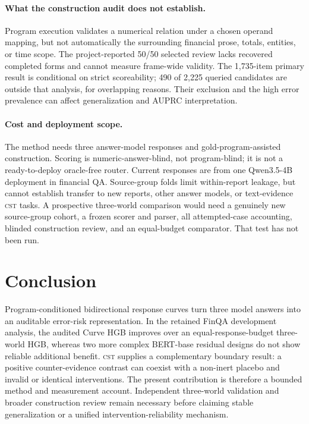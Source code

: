 \documentclass[11pt]{article}
\newcommand{\CST}{\textsc{cst}}
\begin{document}
\paragraph{What the construction audit does not establish.}
Program execution validates a numerical relation under a chosen operand mapping, but not automatically the surrounding financial prose, totals, entities, or time scope. The project-reported 50/50 selected review lacks recovered completed forms and cannot measure frame-wide validity. The 1,735-item primary result is conditional on strict scoreability; 490 of 2,225 queried candidates are outside that analysis, for overlapping reasons. Their exclusion and the high error prevalence can affect generalization and AUPRC interpretation.

\paragraph{Cost and deployment scope.}
The method needs three answer-model responses and gold-program-assisted construction. Scoring is numeric-answer-blind, not program-blind; it is not a ready-to-deploy oracle-free router. Current responses are from one Qwen3.5-4B deployment in financial QA. Source-group folds limit within-report leakage, but cannot establish transfer to new reports, other answer models, or text-evidence \CST{} tasks. A prospective three-world comparison would need a genuinely new source-group cohort, a frozen scorer and parser, all attempted-case accounting, blinded construction review, and an equal-budget comparator. That test has not been run.

\section{Conclusion}
Program-conditioned bidirectional response curves turn three model answers into an auditable error-risk representation. In the retained FinQA development analysis, the audited Curve HGB improves over an equal-response-budget three-world HGB, whereas two more complex BERT-base residual designs do not show reliable additional benefit. \CST{} supplies a complementary boundary result: a positive counter-evidence contrast can coexist with a non-inert placebo and invalid or identical interventions. The present contribution is therefore a bounded method and measurement account. Independent three-world validation and broader construction review remain necessary before claiming stable generalization or a unified intervention-reliability mechanism.
\end{document}
